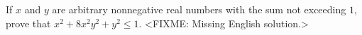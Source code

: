 \problem{}
If $x$ and $y$ are arbitrary nonnegative real numbers with the sum not exceeding $1$,
prove that $x^2 + 8 x^2 y^2 + y^2 \leq 1$.
\solution
<FIXME: Missing English solution.>
\endproblem
